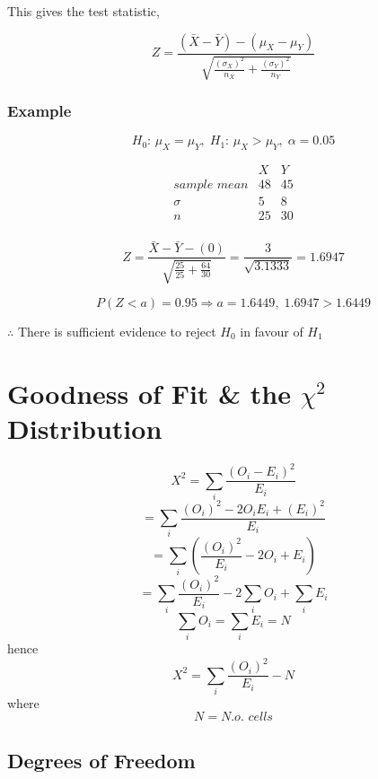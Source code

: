 \documentclass{article}
\begin{document}

\noindent This gives the test statistic,

\[Z = \frac{\left(\bar{X} - \bar{Y}\right) - \left(\mu_X - \mu_Y\right)}
{\sqrt{\frac{\left(\sigma_X\right)^2}{n_X} +
\frac{\left(\sigma_Y\right)^2}{n_Y}}}\]

\subsubsection{Example}

\[H_0:\, \mu_X = \mu_Y,\; H_1:\, \mu_X > \mu_Y,\; \alpha = 0.05\]

\[\begin{array}{ccc}
    
                         & X  & Y \\
    \textit{sample mean} & 48 & 45 \\
    \sigma               & 5  & 8 \\
    n                    & 25 & 30 \\

\end{array}\]

\[Z = \frac{\bar{X} - \bar{Y} - (0)}{\sqrt{\frac{25}{25} + \frac{64}{30}}} =
\frac{3}{\sqrt{3.1333}} = 1.6947\]

\[P\left(Z < a\right) = 0.95 \Rightarrow a = 1.6449,\; 1.6947 > 1.6449\]

\noindent $\therefore$ There is sufficient evidence to reject $H_0$ in favour of
$H_1$

\section{Goodness of Fit \& the $\chi^2$ Distribution}

\[X^2 = \sum_i \frac{\left(O_i - E_i\right)^2}{E_i}\] \[= \sum_i
\frac{\left(O_i\right)^2 - 2O_iE_i + \left(E_i\right)^2}{E_i}\] \[= \sum_i
\left(\frac{\left(O_i\right)^2}{E_i} - 2O_i + E_i\right)\] \[= \sum_i
\frac{\left(O_i\right)^2}{E_i} - 2\sum_iO_i + \sum_iE_i\] \[\sum_i O_i = \sum_i
E_i = N\] hence \[X^2 = \sum_i \frac{\left(O_i\right)^2}{E_i} - N\] where
\[N = \textit{N.o. cells}\] 

\subsection{Degrees of Freedom}
\end{document}
